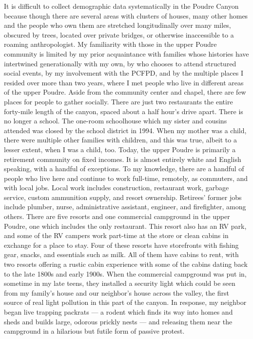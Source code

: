 \documentclass[
]{article}
\begin{document}
It is difficult to collect demographic data systematically in the Poudre Canyon because though there are several areas with clusters of houses, many other homes and the people who own them are stretched longitudinally over many miles, obscured by trees, located over private bridges, or otherwise inaccessible to a roaming anthropologist. My familiarity with those in the upper Poudre community is limited by my prior acquaintance with families whose histories have intertwined generationally with my own, by who chooses to attend structured social events, by my involvement with the PCFPD, and by the multiple places I resided over more than two years, where I met people who live in different areas of the upper Poudre. Aside from the community center and chapel, there are few places for people to gather socially. There are just two restaurants the entire forty-mile length of the canyon, spaced about a half hour's drive apart. There is no longer a school. The one-room schoolhouse which my sister and cousins attended was closed by the school district in 1994. When my mother was a child, there were multiple other families with children, and this was true, albeit to a lesser extent, when I was a child, too. Today, the upper Poudre is primarily a retirement community on fixed incomes. It is almost entirely white and English speaking, with a handful of exceptions. To my knowledge, there are a handful of people who live here and continue to work full-time, remotely, as commuters, and with local jobs. Local work includes construction, restaurant work, garbage service, custom ammunition supply, and resort ownership. Retirees' former jobs include plumber, nurse, administrative assistant, engineer, and firefighter, among others. There are five resorts and one commercial campground in the upper Poudre, one which includes the only restaurant. This resort also has an RV park, and some of the RV campers work part-time at the store or clean cabins in exchange for a place to stay. Four of these resorts have storefronts with fishing gear, snacks, and essentials such as milk. All of them have cabins to rent, with two resorts offering a rustic cabin experience with some of the cabins dating back to the late 1800s and early 1900s. When the commercial campground was put in, sometime in my late teens, they installed a security light which could be seen from my family's house and our neighbor's house across the valley, the first source of real light pollution in this part of the canyon. In response, my neighbor began live trapping packrats --- a rodent which finds its way into homes and sheds and builds large, odorous prickly nests --- and releasing them near the campground in a hilarious but futile form of passive protest.
\end{document}
